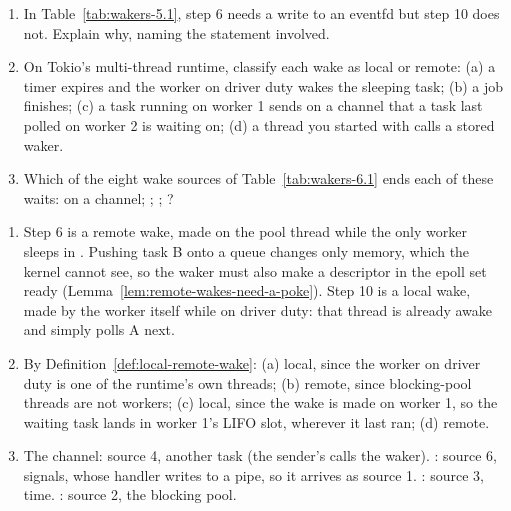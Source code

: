 \begin{Exercise}[title={Wake paths}]
    \begin{enumerate}
        \item In Table~\ref{tab:wakers-5.1}, step 6 needs a write to an eventfd but step 10 does not. Explain why, naming the statement involved.
        \item On Tokio's multi-thread runtime, classify each wake as local or remote: (a) a timer expires and the worker on driver duty wakes the sleeping task; (b) a  job finishes; (c) a task running on worker 1 sends on a channel that a task last polled on worker 2 is waiting on; (d) a thread you started with  calls a stored waker.
        \item Which of the eight wake sources of Table~\ref{tab:wakers-6.1} ends each of these waits:  on a  channel; ; ; ?
    \end{enumerate}
\end{Exercise}
\begin{Answer}
    \begin{enumerate}
        \item Step 6 is a remote wake, made on the pool thread while the only worker sleeps in . Pushing task B onto a queue changes only memory, which the kernel cannot see, so the waker must also make a descriptor in the epoll set ready (Lemma~\ref{lem:remote-wakes-need-a-poke}). Step 10 is a local wake, made by the worker itself while on driver duty: that thread is already awake and simply polls A next.
        \item By Definition~\ref{def:local-remote-wake}: (a) local, since the worker on driver duty is one of the runtime's own threads; (b) remote, since blocking-pool threads are not workers; (c) local, since the wake is made on worker 1, so the waiting task lands in worker 1's LIFO slot, wherever it last ran; (d) remote.
        \item The channel: source 4, another task (the sender's  calls the waker). : source 6, signals, whose handler writes to a pipe, so it arrives as source 1. : source 3, time. : source 2, the blocking pool.
    \end{enumerate}
\end{Answer}
